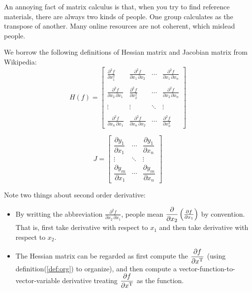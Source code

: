 An annoying fact of matrix calculus is that, when you 
try to find reference materials, there are always two kinds 
of people. One group calculates as the transpose of another. 
Many online resources are not coherent, which mislead people. 

We borrow the following definitions of Hessian matrix\cite{wiki_hesse} 
and Jacobian matrix\cite{wiki_jacobian} from Wikipedia: 
\begin{equation}
	H(f) = 
	\left[
	\begin{matrix}
\frac{\partial^2 f}{\partial x_1^2} & \frac{\partial^2 f}{\partial x_1\,\partial x_2} & \cdots & \frac{\partial^2 f}{\partial x_1\,\partial x_n} \\  \\
\frac{\partial^2 f}{\partial x_2\,\partial x_1} & \frac{\partial^2 f}{\partial x_2^2} & \cdots & \frac{\partial^2 f}{\partial x_2\,\partial x_n} \\  \\
\vdots & \vdots & \ddots & \vdots \\  \\
\frac{\partial^2 f}{\partial x_n\,\partial x_1} & \frac{\partial^2 f}{\partial x_n\,\partial x_2} & \cdots & \frac{\partial^2 f}{\partial x_n^2}
	\end{matrix}
	\right]
\end{equation}

\begin{equation}
	J = 
	\left[
	\begin{matrix}
\dfrac{\partial y_1}{\partial x_1} & \cdots & \dfrac{\partial y_1}{\partial x_n} \\ \vdots & \ddots & \vdots \\ \dfrac{\partial y_m}{\partial x_1} & \cdots & \dfrac{\partial y_m}{\partial x_n}
	\end{matrix}
	\right]
\end{equation}

Note two things about second order derivative:
\begin{itemize}
	\item By writting the abbreviation $\frac{\partial^2 f}{\partial x_2\,\partial x_1}$, 
	people mean $\dfrac{\partial }{\partial x_2}\left(\frac{\partial f}{\partial x_1}\right)$ by 
	convention. That is, first take derivative with respect to $x_1$ and 
	then take derivative with respect to $x_2$. 
	\item The Hessian matrix can be regarded as first compute the $\dfrac{\partial f}{\partial x^\mathrm{T}}$
	(using definition(\ref{def:org}) to organize), and then compute 
	a vector-function-to-vector-variable derivative
	treating $\dfrac{\partial f}{\partial x^\mathrm{T}}$ as the function. 
\end{itemize}

